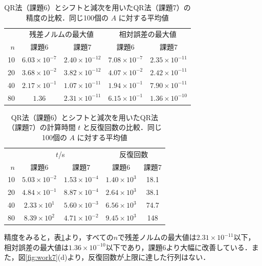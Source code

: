 \documentclass{jarticle}
\begin{document}
\begin{table}[htbp]
    \centering
    \footnotesize\setlength{\tabcolsep}{3pt}
    \caption{QR法（課題6）とシフトと減次を用いたQR法（課題7）の精度の比較．同じ100個の $A$ に対する平均値}
    \label{tab:work7_acc}
    \begin{tabular}{rcccc}
        \hline
        & \multicolumn{2}{c}{残差ノルムの最大値} & \multicolumn{2}{c}{相対誤差の最大値} \\
        $n$ & 課題6 & 課題7 & 課題6 & 課題7 \\
        \hline
        10 & $6.03\times10^{-7}$ & $2.40\times10^{-12}$ & $7.08\times10^{-7}$ & $2.35\times10^{-11}$ \\
        20 & $3.68\times10^{-2}$ & $3.82\times10^{-12}$ & $4.07\times10^{-2}$ & $2.42\times10^{-11}$ \\
        40 & $2.17\times10^{-1}$ & $1.07\times10^{-11}$ & $1.94\times10^{-1}$ & $7.90\times10^{-11}$ \\
        80 & $1.36$ & $2.31\times10^{-11}$ & $6.15\times10^{-1}$ & $1.36\times10^{-10}$ \\
        \hline
    \end{tabular}
\end{table}

\begin{table}[htbp]
    \centering
    \footnotesize\setlength{\tabcolsep}{3pt}
    \caption{QR法（課題6）とシフトと減次を用いたQR法（課題7）の計算時間 $t$ と反復回数の比較．同じ100個の $A$ に対する平均値}
    \label{tab:work7_spd}
    \begin{tabular}{rcccc}
        \hline
        & \multicolumn{2}{c}{$t$/s} & \multicolumn{2}{c}{反復回数} \\
        $n$ & 課題6 & 課題7 & 課題6 & 課題7 \\
        \hline
        10 & $5.03\times10^{-2}$ & $1.53\times10^{-4}$ & $1.40\times10^{3}$ & 18.1 \\
        20 & $4.84\times10^{-1}$ & $8.87\times10^{-4}$ & $2.64\times10^{3}$ & 38.1 \\
        40 & $2.33\times10^{1}$ & $5.60\times10^{-3}$ & $6.56\times10^{3}$ & 74.7 \\
        80 & $8.39\times10^{2}$ & $4.71\times10^{-2}$ & $9.45\times10^{3}$ & 148 \\
        \hline
    \end{tabular}
\end{table}

精度をみると，表\ref{tab:work7_acc}より，すべての$n$で残差ノルムの最大値は$2.31\times10^{-11}$以下，相対誤差の最大値は$1.36\times10^{-10}$以下であり，課題6より大幅に改善している．また，図\ref{fig:work7}(d)より，反復回数が上限に達した行列はない．
\end{document}
